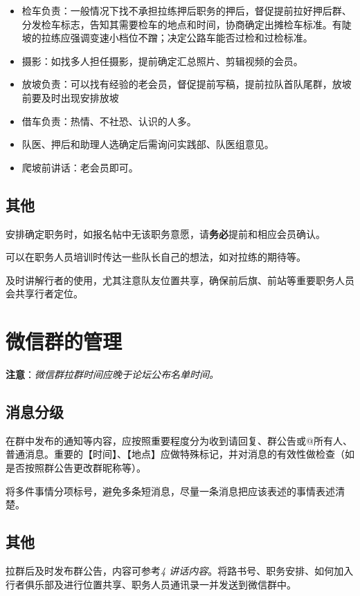 \documentclass[UTF8]{ctexart}
\begin{document}
\begin{itemize}[nosep,left=2em]
    \item 检车负责：一般情况下找不承担拉练押后职务的押后，督促提前拉好押后群、分发检车标志，告知其需要检车的地点和时间，协商确定出摊检车标准。有陡坡的拉练应强调变速小档位不蹭；决定公路车能否过检和过检标准。
    \item 摄影：如找多人担任摄影，提前确定汇总照片、剪辑视频的会员。
    \item 放坡负责：可以找有经验的老会员，督促提前写稿，提前拉队首队尾群，放坡前要及时出现安排放坡
    \item 借车负责：热情、不社恐、认识的人多。
    \item 队医、押后和助理人选确定后需询问实践部、队医组意见。
    \item 爬坡前讲话：老会员即可。
\end{itemize}

\subsection{其他}

安排确定职务时，如报名帖中无该职务意愿，请\textbf{务必}提前和相应会员确认。

可以在职务人员培训时传达一些队长自己的想法，如对拉练的期待等。

及时讲解行者的使用，尤其注意队友位置共享，确保前后旗、前站等重要职务人员会共享行者定位。

\section{微信群的管理}
\textbf{注意}：\textit{微信群拉群时间应晚于论坛公布名单时间。}

\subsection{消息分级}

在群中发布的通知等内容，应按照重要程度分为收到请回复、群公告或@所有人、普通消息。重要的【时间】、【地点】应做特殊标记，并对消息的有效性做检查（如是否按照群公告更改群昵称等）。

将多件事情分项标号，避免多条短消息，尽量一条消息把应该表述的事情表述清楚。

\subsection{其他}

拉群后及时发布群公告，内容可参考{\color{blue}\textit{4 讲话内容}}。将路书号、职务安排、如何加入行者俱乐部及进行位置共享、职务人员通讯录一并发送到微信群中。
\end{document}
